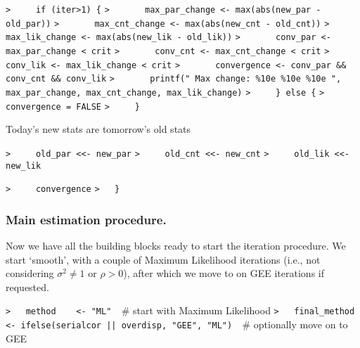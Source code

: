 \documentclass[a4paper]{article}
\begin{document}
\verb~>     if (iter>1) {~\newline
\verb~>       max_par_change <- max(abs(new_par - old_par))~\newline
\verb~>       max_cnt_change <- max(abs(new_cnt - old_cnt))~\newline
\verb~>       max_lik_change <- max(abs(new_lik - old_lik))~\newline
\verb~>       conv_par <- max_par_change < crit~\newline
\verb~>       conv_cnt <- max_cnt_change < crit~\newline
\verb~>       conv_lik <- max_lik_change < crit~\newline
\verb~>       convergence <- conv_par && conv_cnt && conv_lik~\newline
\verb~>       printf(" Max change: %10e %10e %10e ", max_par_change, max_cnt_change, max_lik_change)~\newline
\verb~>     } else {~\newline
\verb~>       convergence = FALSE~\newline
\verb~>     }~\par

Today's new stats are tomorrow's old stats\par
\verb~>     old_par <<- new_par~\newline
\verb~>     old_cnt <<- new_cnt~\newline
\verb~>     old_lik <<- new_lik~\par

\verb~>     convergence~\newline
\verb~>   }~\par



\subsubsection{Main estimation procedure.}
Now we have all the building blocks ready to start the iteration procedure.
We start `smooth', with a couple of Maximum Likelihood iterations
(i.e., not considering $\sigma^2\neq1$ or $\rho>0$), after which we move to on
GEE iterations if requested.\par

\verb~>   method    <- "ML"  ~{\sffamily\# start with Maximum Likelihood}\newline
\verb~>   final_method <- ifelse(serialcor || overdisp, "GEE", "ML")  ~{\sffamily\# optionally move on to GEE}\par
\end{document}
